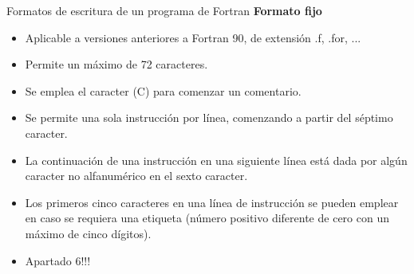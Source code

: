 \begin{frame}[fragile]{Formatos de escritura de un programa de Fortran}
 \textbf{Formato fijo}
  \begin{itemize}[<+(1)->]
   \item Aplicable a versiones anteriores a Fortran 90, de extensión .f, .for, ...
   \item Permite un máximo de 72 caracteres.
   \item Se emplea el caracter (C) para comenzar un comentario. 
   \item Se permite una sola instrucción por línea, comenzando a partir del séptimo caracter.
   \item La continuación de una instrucción en una siguiente línea está dada por algún caracter no alfanumérico en el sexto caracter. 
   \item Los primeros cinco caracteres en una línea de instrucción se pueden emplear en caso se requiera una etiqueta (número positivo diferente de cero con un máximo de cinco dígitos).
   \item Apartado 6!!!
  \end{itemize}
\end{frame}

